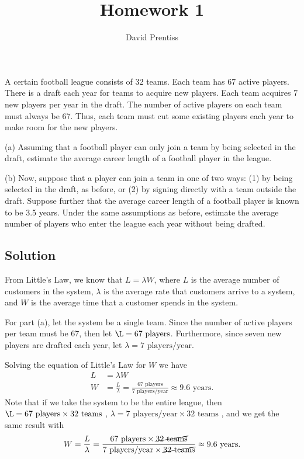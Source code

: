 \documentclass{amsart}
\title{Homework 1}
\author{David Prentiss}
\begin{document}
\maketitle

\section{} %
A certain football league consists of 32 teams. Each team has 67 active
players. There is a draft each year for teams to acquire new players. Each
team acquires 7 new players per year in the draft. The number of active
players on each team must always be 67. Thus, each team must cut some
existing players each year to make room for the new players.

(a) Assuming that a football player can only join a team by being selected
in the draft, estimate the average career length of a football player in
the league.

(b) Now, suppose that a player can join a team in one of two ways: (1) by
being selected in the draft, as before, or (2) by signing directly with a
team outside the draft. Suppose further that the average career length of
a football player is known to be 3.5 years. Under the same assumptions
as before, estimate the average number of players who enter the league
each year without being drafted.

\subsection*{Solution}

From Little's Law, we know that $L=\lambda W$, where $L$ is the average number
of customers in the system, $\lambda$ is the average rate that customers arrive
to a system, and $W$ is the average time that a customer spends in the system.

For part (a), let the system be a single team. Since the number of active
players per team must be 67, then let $\L = 67 \text{ players}$. Furthermore, since seven
new players are drafted each year, let $\lambda = 7 \text{ players/year}$.

Solving the equation of Little's Law for $W$ we have
\begin{align}
  L &= \lambda W \\
  W &= \frac{L}{\lambda} = \frac{67 \text{ players}}{7 \text{ players/year}} \approx 9.6 \text{ years}.
\end{align}
Note that if we take the system to be the entire league, then
$\L = 67 \text{ players} \times 32 \text{ teams}$
,
$\lambda = 7 \text{ players/year}\times 32 \text{ teams}$
, and we get the same result with
\begin{equation}
  W = \frac{L}{\lambda} = \frac{67 \text{ players} \times \cancel{32 \text{ teams}}}
  {7 \text{ players/year}\times \cancel{32 \text{ teams}}} \approx 9.6 \text{ years}.
\end{equation}
\end{document}
